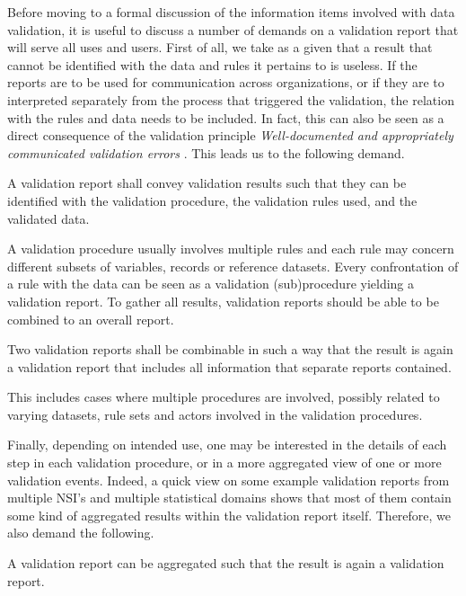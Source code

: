 Before moving to a formal discussion of the information items involved with
data validation, it is useful to discuss a number of demands on a validation
report that will serve all uses and users. First of all, we take as a given
that a result that cannot be identified with the data and rules it pertains to
is useless. If the reports are to be used for communication across
organizations, or if they are to interpreted separately from the process that
triggered the validation, the relation with the rules and data needs to be
included.  In fact, this can also be seen as a direct consequence of the
validation principle \emph{Well-documented and appropriately communicated
validation errors} \citep{ess2017}. This leads us to the following demand.

\begin{demand}[Identification]
A validation report shall convey validation results such that they can be
identified with the validation procedure, the validation rules used, and the
validated data.
\label{dem:identify}
\end{demand}


A validation procedure usually involves multiple rules and each rule may
concern different subsets of variables, records or reference datasets. Every
confrontation of a rule with the data can be seen as a validation
(sub)procedure yielding a validation report. To gather all results, validation
reports should be able to be combined to an overall report.
%
\begin{demand}
Two validation reports shall be combinable in such a way that the result is
again a validation report that includes all information that separate reports
contained.
\label{dem:combine}
\end{demand}
%
This includes cases where multiple procedures are involved, possibly related
to varying datasets, rule sets and actors involved in the validation procedures. 

Finally, depending on intended use, one may be interested in the details of
each step in each validation procedure, or in a more aggregated view of one or
more validation events. Indeed, a quick view on some example validation reports
from multiple NSI's and multiple statistical domains shows that most of them
contain some kind of aggregated results within the validation report itself.
Therefore, we also demand the following.

\begin{demand}
A validation report can be aggregated such that the result is again a
validation report.
\label{dem:aggregate}
\end{demand}

